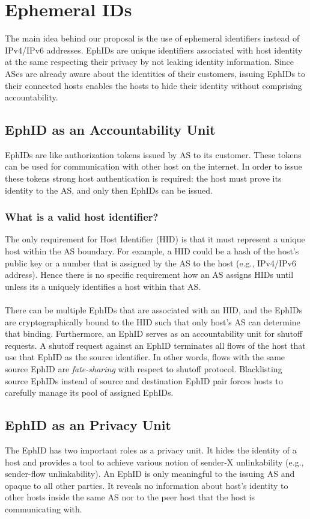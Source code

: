 \section{Ephemeral IDs} \label{sec:ephid}
The main idea behind our proposal is the use of ephemeral identifiers instead of IPv4/IPv6 addresses. EphIDs are unique identifiers associated with host identity at the same respecting their privacy by not leaking identity information. Since ASes are already aware about the identities of their customers, issuing EphIDs to their connected hosts enables the hosts to hide their identity without comprising accountability.

\subsection{EphID as an Accountability Unit}
EphIDs are like authorization tokens issued by AS to its customer. These tokens can be used for communication with other host on the internet. In order to issue these tokens strong host authentication is required: the host must prove its identity to the AS, and only then EphIDs can be issued.
\subsubsection{What is a valid host identifier?} 
The only requirement for Host Identifier (HID) is that it must represent a unique host within the AS boundary. For example, a HID could be a hash of the host's public key or a number that is assigned by the AS to the host (e.g., IPv4/IPv6 address). Hence there is no specific requirement how an AS assigns HIDs until unless its a uniquely identifies a host within that AS.
\\ \\
There can be multiple EphIDs that are associated with an HID, and the EphIDs are cryptographically bound to the HID such that only host's AS can determine that binding. Furthermore, an EphID serves as an accountability unit for shutoff requests. A shutoff request against an EphID terminates all flows of the host that use that EphID as the source identifier. In other words, flows with the same source EphID are \textit{fate-sharing} with respect to shutoff protocol. Blacklisting source EphIDs instead of source and destination EphID pair forces hosts to carefully manage its pool of assigned EphIDs.

\subsection{EphID as an Privacy Unit}
The EphID has two important roles as a privacy unit. It hides the identity of a host and provides a tool to achieve various notion of sender-X unlinkability (e.g., sender-flow unlinkability). An EphID is only meaningful to the issuing AS and opaque to all other parties. It reveals no information about host's identity to other hosts inside the same AS nor to the peer host that the host is communicating with.

